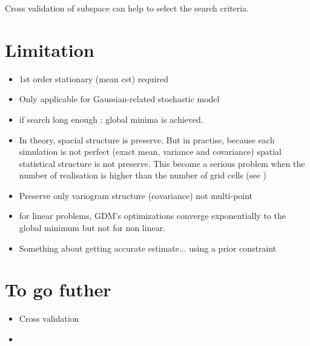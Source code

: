 \documentclass[twocolumn]{article}
\numberwithin{equation}{section}
\begin{document}
Cross validation of subspace can help to select the search criteria.


\section{Limitation}
\begin{itemize}
	\item 1st order stationary (mean cst) required
	\item Only applicable for Gaussian-related stochastic model
	\item if search long enough : global minima is achieved.
	\item In theory, spacial structure is preserve. But in practise, because each simulation is not perfect (exact mean, variance and covariance) spatial statistical structure is not preserve. This become a serious problem when the number of realisation is higher than the number of grid cells (see \cite{Hu2002})
	\item Preserve only variogram structure (covariance) not multi-point
	\item for linear problems, GDM's optimizations  converge exponentially to the global minimum but not for non linear. 
	\item Something about getting accurate estimate... using a prior constraint \cite{LeRavalec-Dupin2002}
\end{itemize}

\section{To go futher}
\begin{itemize}
\item Cross validation
\item 
\end{itemize}





	
	
\end{document}
